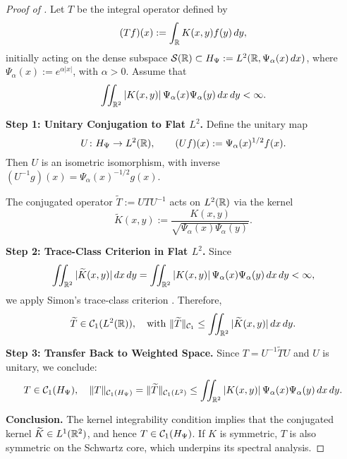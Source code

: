 \begin{proof}[Proof of ]
Let \( T \) be the integral operator defined by
\[
(Tf)(x) := \int_{\mathbb{R}} K(x, y) f(y) \, dy,
\]
initially acting on the dense subspace \( \mathcal{S}(\mathbb{R}) \subset H_{\Psi} := L^2(\mathbb{R}, \Psi_\alpha(x)\, dx) \), where \( \Psi_\alpha(x) := e^{\alpha |x|} \), with \( \alpha > 0 \). Assume that
\[
\iint_{\mathbb{R}^2} |K(x, y)|\, \Psi_\alpha(x) \Psi_\alpha(y)\, dx\, dy < \infty.
\]

\medskip
\noindent\textbf{Step 1: Unitary Conjugation to Flat \( L^2 \).}
Define the unitary map
\[
U \colon H_{\Psi} \to L^2(\mathbb{R}), \qquad (Uf)(x) := \Psi_\alpha(x)^{1/2} f(x).
\]
Then \( U \) is an isometric isomorphism, with inverse \( (U^{-1}g)(x) = \Psi_\alpha(x)^{-1/2} g(x) \).

The conjugated operator \( \widetilde{T} := U T U^{-1} \) acts on \( L^2(\mathbb{R}) \) via the kernel
\[
\widetilde{K}(x, y) := \frac{K(x,y)}{\sqrt{\Psi_\alpha(x) \Psi_\alpha(y)}}.
\]

\medskip
\noindent\textbf{Step 2: Trace-Class Criterion in Flat \( L^2 \).}
Since
\[
\iint_{\mathbb{R}^2} |\widetilde{K}(x, y)|\, dx\, dy = \iint_{\mathbb{R}^2} |K(x, y)|\, \Psi_\alpha(x) \Psi_\alpha(y)\, dx\, dy < \infty,
\]
we apply Simon’s trace-class criterion \cite[Thm.~4.2]{Simon2005TraceIdeals}. Therefore,
\[
\widetilde{T} \in \mathcal{C}_1(L^2(\mathbb{R})), \quad \text{with } \|\widetilde{T}\|_{\mathcal{C}_1} \le \iint_{\mathbb{R}^2} |\widetilde{K}(x, y)|\, dx\, dy.
\]

\medskip
\noindent\textbf{Step 3: Transfer Back to Weighted Space.}
Since \( T = U^{-1} \widetilde{T} U \) and \( U \) is unitary, we conclude:
\[
T \in \mathcal{C}_1(H_{\Psi}), \quad \|T\|_{\mathcal{C}_1(H_{\Psi})} = \|\widetilde{T}\|_{\mathcal{C}_1(L^2)} \le \iint_{\mathbb{R}^2} |K(x, y)|\, \Psi_\alpha(x)\Psi_\alpha(y)\, dx\, dy.
\]

\medskip
\noindent\textbf{Conclusion.}
The kernel integrability condition implies that the conjugated kernel \( \widetilde{K} \in L^1(\mathbb{R}^2) \), and hence \( T \in \mathcal{C}_1(H_{\Psi}) \). If \( K \) is symmetric, \( T \) is also symmetric on the Schwartz core, which underpins its spectral analysis.
\end{proof}
